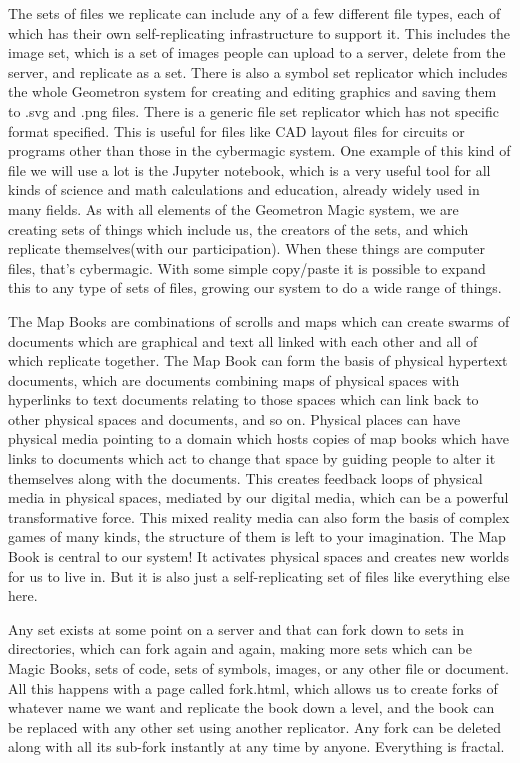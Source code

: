 The sets of files we replicate can include any of a few different file
types, each of which has their own self-replicating infrastructure to
support it. This includes the image set, which is a set of images people
can upload to a server, delete from the server, and replicate as a set.
There is also a symbol set replicator which includes the whole Geometron
system for creating and editing graphics and saving them to .svg and
.png files. There is a generic file set replicator which has not
specific format specified. This is useful for files like CAD layout
files for circuits or programs other than those in the cybermagic
system. One example of this kind of file we will use a lot is the
Jupyter notebook, which is a very useful tool for all kinds of science
and math calculations and education, already widely used in many fields.
As with all elements of the Geometron Magic system, we are creating sets
of things which include us, the creators of the sets, and which
replicate themselves(with our participation). When these things are
computer files, that's cybermagic. With some simple copy/paste it is
possible to expand this to any type of sets of files, growing our system
to do a wide range of things.

The Map Books are combinations of scrolls and maps which can create
swarms of documents which are graphical and text all linked with each
other and all of which replicate together. The Map Book can form the
basis of physical hypertext documents, which are documents combining
maps of physical spaces with hyperlinks to text documents relating to
those spaces which can link back to other physical spaces and documents,
and so on. Physical places can have physical media pointing to a domain
which hosts copies of map books which have links to documents which act
to change that space by guiding people to alter it themselves along with
the documents. This creates feedback loops of physical media in physical
spaces, mediated by our digital media, which can be a powerful
transformative force. This mixed reality media can also form the basis
of complex games of many kinds, the structure of them is left to your
imagination. The Map Book is central to our system! It activates
physical spaces and creates new worlds for us to live in. But it is also
just a self-replicating set of files like everything else here.

Any set exists at some point on a server and that can fork down to sets
in directories, which can fork again and again, making more sets which
can be Magic Books, sets of code, sets of symbols, images, or any other
file or document. All this happens with a page called fork.html, which
allows us to create forks of whatever name we want and replicate the
book down a level, and the book can be replaced with any other set using
another replicator. Any fork can be deleted along with all its sub-fork
instantly at any time by anyone. Everything is fractal.

